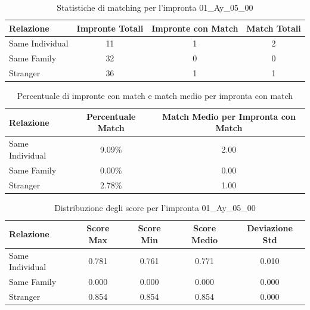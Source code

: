 \begin{table}[htbp]
\centering
\caption{Statistiche di matching per l'impronta 01\_Ay\_05\_00}
\label{tab:results_01_Ay_05_00}
\begin{tabular}{|l|c|c|c|}
\hline
\textbf{Relazione} & \textbf{Impronte Totali} & \textbf{Impronte con Match} & \textbf{Match Totali} \\
\hline
Same Individual & 11 & 1 & 2 \\
\hline
Same Family & 32 & 0 & 0 \\
\hline
Stranger & 36 & 1 & 1 \\
\hline
\end{tabular}
\end{table}


\begin{table}[htbp]
\centering
\caption{Percentuale di impronte con match e match medio per impronta con match}
\label{tab:match_percentage_01_Ay_05_00}
\begin{tabular}{|l|c|c|}
\hline
\textbf{Relazione} & \textbf{Percentuale Match} & \textbf{Match Medio per Impronta con Match} \\
\hline
Same Individual & 9.09\% & 2.00 \\
\hline
Same Family & 0.00\% & 0.00 \\
\hline
Stranger & 2.78\% & 1.00 \\
\hline
\end{tabular}
\end{table}


\begin{table}[htbp]
\centering
\caption{Distribuzione degli score per l'impronta 01\_Ay\_05\_00}
\label{tab:scores_01_Ay_05_00}
\begin{tabular}{|l|c|c|c|c|}
\hline
\textbf{Relazione} & \textbf{Score Max} & \textbf{Score Min} & \textbf{Score Medio} & \textbf{Deviazione Std} \\
\hline
Same Individual & 0.781 & 0.761 & 0.771 & 0.010 \\
\hline
Same Family & 0.000 & 0.000 & 0.000 & 0.000 \\
\hline
Stranger & 0.854 & 0.854 & 0.854 & 0.000 \\
\hline
\end{tabular}
\end{table}

